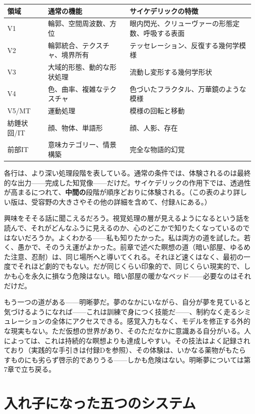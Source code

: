 \documentclass[11pt, twoside, openright]{book}
\begin{document}
{\small
\noindent
\begin{tabularx}{\linewidth}{X X X}
\toprule
\textbf{領域} & \textbf{通常の機能} & \textbf{サイケデリックの特徴} \\
\midrule
V1 & 輪郭、空間周波数、方位 & 眼内閃光、クリューヴァーの形態定数、呼吸する表面 \\[4pt]
V2 & 輪郭統合、テクスチャ、境界所有 & テッセレーション、反復する幾何学模様 \\[4pt]
V3 & 大域的形態、動的な形状処理 & 流動し変形する幾何学形状 \\[4pt]
V4 & 色、曲率、複雑なテクスチャ & 色づいたフラクタル、万華鏡のような模様 \\[4pt]
V5/MT & 運動処理 & 模様の回転と移動 \\[4pt]
紡錘状回/IT & 顔、物体、単語形 & 顔、人影、存在 \\[4pt]
前部IT & 意味カテゴリー、情景構築 & 完全な物語的幻覚 \\[4pt]
\bottomrule
\end{tabularx}
}


各行は、より深い処理段階を表している。通常の条件では、体験されるのは最終的な出力------完成した知覚像------だけだ。サイケデリックの作用下では、透過性が高まるにつれて、\textbf{中間の}段階が順序どおりに体験される。（この表のより詳しい版は、受容野の大きさやその他の詳細を含めて、付録Aにある。）

興味をそそる話に聞こえるだろう。視覚処理の層が見えるようになるという話を読んで、それがどんなふうに見えるのか、心のどこかで知りたくなっているのではないだろうか。よくわかる------私も知りたかった。私は両方の道を試した。若く、愚かで、そのうえ運がよかった。前章で述べた瞑想の道（暗い部屋、ゆるめた注意、忍耐）は、同じ場所へと導いてくれる。それほど速くはなく、最初の一度でそれほど劇的でもない。だが同じくらい印象的で、同じくらい現実的で、しかも心を永久に損なう危険はない。暗い部屋の暖かなベッド------必要なのはそれだけだ。

もう一つの道がある------明晰夢だ。夢のなかにいながら、自分が夢を見ていると気づけるようになれば------これは訓練で身につく技能だ------、制約なく走るシミュレーションの全体にアクセスできる。感覚入力もなく、モデルを修正する外的な現実もない。ただ仮想の世界があり、そのただなかに意識ある自分がいる。人によっては、これは持続的な瞑想よりも達成しやすい。その技法はよく記録されており（実践的な手引きは付録Dを参照）、その体験は、いかなる薬物がもたらすものにも劣らず啓示的でありうる------しかも危険はない。明晰夢については第7章で立ち戻る。

\section*{入れ子になった五つのシステム}
\end{document}
